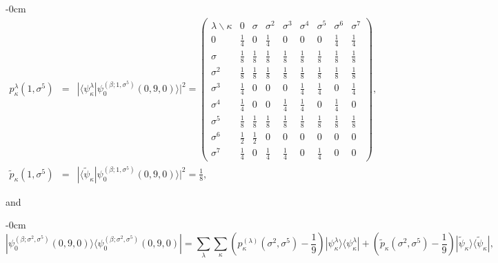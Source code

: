 \documentclass[quantumrep,article,submit,pdftex,moreauthors]{Definitions/mdpi}
\begin{document}
\begin{adjustwidth}{-\extralength}{0cm}
\begin{eqnarray}
  p_{\kappa}^{\lambda}(1,\sigma^{5})
  &=& |\langle \psi_{\kappa }^{\lambda}
  |\psi_{0}^{(\beta ;1,\sigma ^{5})}(0,9,0)\rangle|^{2}
  = \left(\begin{array}{ccccccccc} \lambda \backslash \kappa  & 0 & \sigma  &
      \sigma ^{2} & \sigma ^{3} & \sigma^{4} & \sigma ^{5} & \sigma ^{6} &
      \sigma ^{7} \\ 
    0 & \frac{1}{4} & 0 & \frac{1}{4} & 0 & 0 & 0 & \frac{1}{4} & \frac{1}{4} \\
    [6pt]
    \sigma & \frac{1}{8} & \frac{1}{8} & \frac{1}{8} & \frac{1}{8} & \frac{1}{8}
           & \frac{1}{8} & \frac{1}{8} & \frac{1}{8} \\ [6pt]
    \sigma^{2} & \frac{1}{8} & \frac{1}{8} & \frac{1}{8} & \frac{1}{8} &
    \frac{1}{8} & \frac{1}{8} & \frac{1}{8} & \frac{1}{8} \\  [6pt]
    \sigma^{3} & \frac{1}{4} & 0 & 0 & 0 & \frac{1}{4} & \frac{1}{4} & 0 &
    \frac{1}{4} \\  [6pt] \sigma^{4} & \frac{1}{4} & 0 & 0 & \frac{1}{4} &
    \frac{1}{4} & 0 & \frac{1}{4} & 0 \\  [6pt]
    \sigma^{5} & \frac{1}{8} & \frac{1}{8} & \frac{1}{8} & \frac{1}{8} &
    \frac{1}{8} & \frac{1}{8} & \frac{1}{8} & \frac{1}{8} \\  [6pt] \sigma^{6} &
    \frac{1}{2} & \frac{1}{2} & 0 & 0 & 0 & 0 & 0 & 0 \\  [6pt]
    \sigma^{7} & \frac{1}{4} & 0 & \frac{1}{4} & \frac{1}{4} & 0 & \frac{1}{4} &
    0 & 0
  \end{array}\right), \\
  \tilde{p}_{\kappa }(1,\sigma^{5})
  &=& |\langle \tilde\psi_\kappa | \psi_0^{(\beta;1,\sigma^5)}(0,9,0)\rangle|^2
  = \frac{1}{8},%
\end{eqnarray}
\end{adjustwidth}

and

\begin{adjustwidth}{-\extralength}{0cm}
\begin{equation}
  |\psi_{0}^{(\beta;\sigma^{2},\sigma^{5})}(0,9,0)\rangle
  \langle \psi_{0}^{(\beta ; \sigma^{2},\sigma^{5})}(0,9,0)|
  = \sum_{\lambda }\sum_{\kappa} \left(
    p_{\kappa }^{(\lambda )}\left( \sigma ^{2},\sigma ^{5}\right) -\frac{1}{9}
  \right)
  |\psi_{\kappa}^{\lambda}\rangle \langle \psi_{\kappa}^{\lambda }|
  + \left( \tilde{p}_{\kappa }(\sigma ^{2},\sigma ^{5})-\frac{1}{9} \right)
  |\tilde{\psi}_{\kappa }\rangle \langle \tilde{\psi}_{\kappa }|,
  \label{nac recon}
\end{equation}
\end{adjustwidth}
\end{document}
